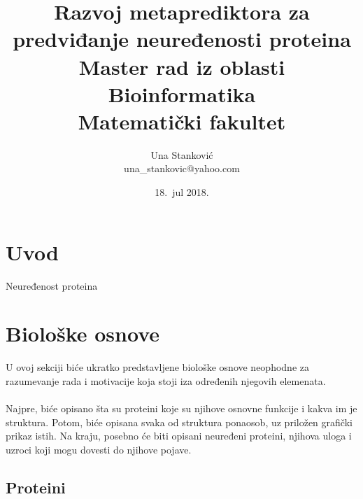 \documentclass[a4paper]{article}
\begin{document}
\title{Razvoj metaprediktora za predviđanje neuređenosti proteina\\ \small{Master rad iz oblasti\\Bioinformatika\\ Matematički fakultet}}

\author{Una Stanković\\ una\_stankovic@yahoo.com}
\date{18.~jul 2018.}
\maketitle


\tableofcontents

\newpage

\section{Uvod}
\label{sec:uvod}
Neuređenost proteina 

\section{Biološke osnove}
\label{sec:prvi}
U ovoj sekciji biće ukratko predstavljene biološke osnove neophodne za razumevanje rada i motivacije koja stoji iza određenih njegovih elemenata.\\\\
Najpre, biće opisano šta su proteini koje su njihove osnovne funkcije i kakva im je struktura. Potom, biće opisana svaka od struktura ponaosob, uz priložen grafički prikaz istih. Na kraju, posebno će biti opisani neuređeni proteini, njihova uloga i uzroci koji mogu dovesti do njihove pojave. 

\subsection{Proteini}
\label{sec:proteini}
\end{document}

